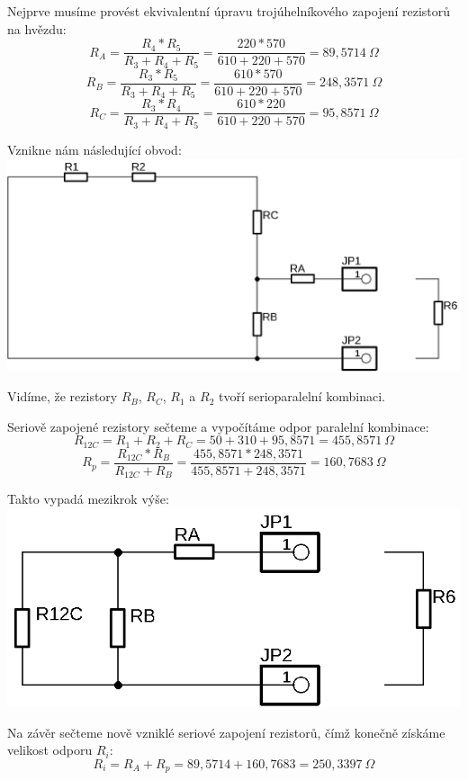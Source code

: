 Nejprve musíme provést ekvivalentní úpravu trojúhelníkového zapojení rezistorů na hvězdu:
{\large$$R_A = \frac{R_4*R_5}{R_3+R_4+R_5} = \frac{220*570}{610+220+570} = 89,5714\:\Omega$$}
{\large$$R_B = \frac{R_3*R_5}{R_3+R_4+R_5} = \frac{610*570}{610+220+570} = 248,3571\:\Omega$$}
{\large$$R_C = \frac{R_3*R_4}{R_3+R_4+R_5} = \frac{610*220}{610+220+570} = 95,8571\:\Omega$$}

Vznikne nám následující obvod: \\

\includegraphics[totalheight=6cm]{fig/2_4.png}

\newpage
Vidíme, že rezistory $R_B$, $R_C$, $R_1$ a $R_2$ tvoří serioparalelní kombinaci.

Seriově zapojené rezistory sečteme a vypočítáme odpor paralelní kombinace:
{\large$$R_{12C} = R_1 + R_2 + R_C = 50 + 310 + 95,8571 = 455,8571\:\Omega$$}
{\large$$R_p = \frac{R_{12C} * R_B}{R_{12C}+R_B} = \frac{455,8571*248,3571}{455,8571+248,3571} = 160,7683\:\Omega$$}

Takto vypadá mezikrok výše: \\

\includegraphics[totalheight=4cm]{fig/2_5.png}

Na závěr sečteme nově vzniklé seriové zapojení rezistorů, čímž konečně získáme velikost odporu $R_i$:
{\large$$R_i = R_A + R_p = 89,5714+160,7683 = 250,3397\:\Omega$$}

